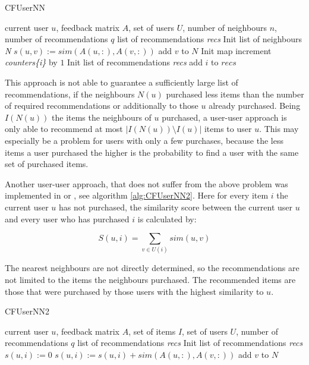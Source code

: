 \documentclass[10pt]{reportMaster}
\begin{document}
\begin{algorithm}
	\caption{CFUserNN}
	\label{alg:CFUserNN}
	\begin{algorithmic}[1]
		\Require current user $u$, feedback matrix $A$, set of users $U$, number of neighbours $n$, number of recommendations $q$
		\Ensure list of recommendations \textit{recs}
		\State Init list of neighbours \textit{N}
			\State $s(u,v) := sim(A(u,:), A(v,:))$
				\State add $v$ to $N$
			\EndIf
		\EndFor
		Init map 
				\State increment \textit{counters\{i\}} by $1$
			\EndFor
		\EndFor
		\State Init list of recommendations \textit{recs}
			\State add $i$ to $recs$
			\EndIf
		\EndFor
	\end{algorithmic}	
\end{algorithm}

This approach is not able to guarantee a sufficiently large list of recommendations, if the neighbours $N(u)$ purchased less items than the number of required recommendations or additionally to those $u$ already purchased.
Being $I(N(u))$ the items the neighbours of $u$ purchased, a user-user approach is only able to recommend at most $|I(N(u)) \setminus I(u)|$ items to user $u$.
This may especially be a problem for users with only a few purchases, because the less items a user purchased the higher is the probability to find a user with the same set of purchased items.

Another user-user approach, that does not suffer from the above problem was implemented in \cite{efficientTopN} or \cite{effectiveLatentModels}, see algorithm \ref{alg:CFUserNN2}.
Here for every item $i$ the current user $u$ has not purchased, the similarity score between the current user $u$ and every user who has purchased $i$ is calculated by: 

\begin{equation}
	S(u,i) = \sum_{v \in U(i)}{sim(u,v)}
\end{equation}

The nearest neighbours are not directly determined, so the recommendations are not limited to the items the neighbours purchased.
The recommended items are those that were purchased by those users with the highest similarity to $u$.

\begin{algorithm}
	\caption{CFUserNN2}
	\label{alg:CFUserNN2}
	\begin{algorithmic}[1]
		\Require current user $u$, feedback matrix $A$, set of items $I$, set of users $U$, number of recommendations $q$
		\Ensure list of recommendations \textit{recs}
		\State Init list of recommendations \textit{recs}
			\State $s(u,i) := 0$
				\State $s(u,i) := s(u,i) + sim(A(u,:), A(v,:))$
			\EndFor
				\State add $v$ to $N$
			\EndIf
		\EndFor
	\end{algorithmic}	
\end{algorithm}
\end{document}
